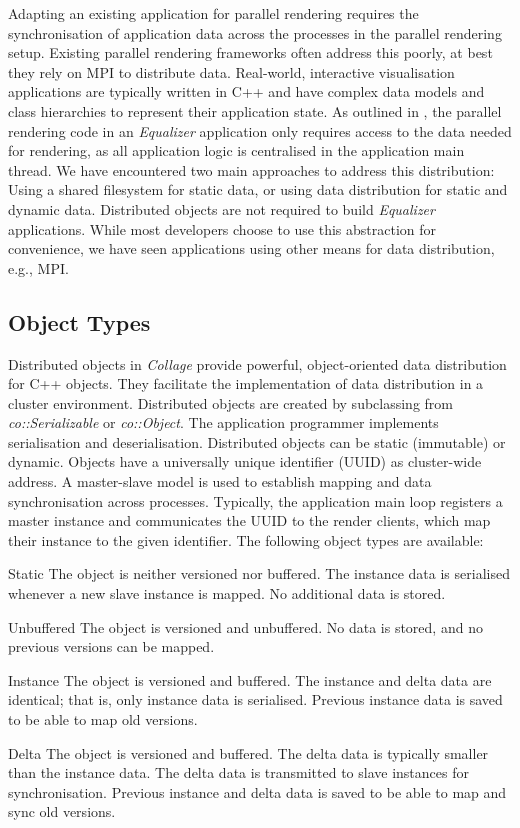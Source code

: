 Adapting an existing application for parallel rendering requires the
synchronisation of application data across the processes in the parallel
rendering setup. Existing parallel rendering frameworks often address this
poorly, at best they rely on MPI to distribute data. Real-world, interactive
visualisation applications are typically written in C++ and have complex data
models and class hierarchies to represent their application state. As outlined
in \cite{EMP:09}, the parallel rendering code in an {\em Equalizer}
application only requires access to the data needed for rendering, as all
application logic is centralised in the application main thread. We have
encountered two main approaches to address this distribution: Using a shared
filesystem for static data, or using data distribution for static and dynamic
data. Distributed objects are not required to build {\em Equalizer}
applications. While most developers choose to use this abstraction for
convenience, we have seen applications using other means for data distribution,
e.g., MPI.

\subsection{Object Types}

Distributed objects in {\em Collage} provide powerful, object-oriented data
distribution for C++ objects. They facilitate the implementation of data
distribution in a cluster environment. Distributed objects are created by
subclassing from {\em co::Serializable} or {\em co::Object}. The
application programmer implements serialisation and deserialisation. Distributed
objects can be static (immutable) or dynamic. Objects have a universally unique
identifier (UUID) as cluster-wide address. A master-slave model is used to
establish mapping and data synchronisation across processes. Typically, the
application main loop registers a master instance and communicates the UUID to
the render clients, which map their instance to the given identifier. The
following object types are available:

\begin{compactdesc}
\item[Static] The object is neither versioned nor buffered. The instance data is
  serialised whenever a new slave instance is mapped. No additional data is
  stored.
\item[Unbuffered] The object is versioned and unbuffered. No data is stored, and
  no previous versions can be mapped.
\item[Instance] The object is versioned and buffered. The instance and delta
  data are identical; that is, only instance data is serialised. Previous
  instance data is saved to be able to map old versions.
\item[Delta] The object is versioned and buffered. The delta data is typically
  smaller than the instance data. The delta data is transmitted to slave
  instances for synchronisation. Previous instance and delta data is saved to be
  able to map and sync old versions.
\end{compactdesc}

